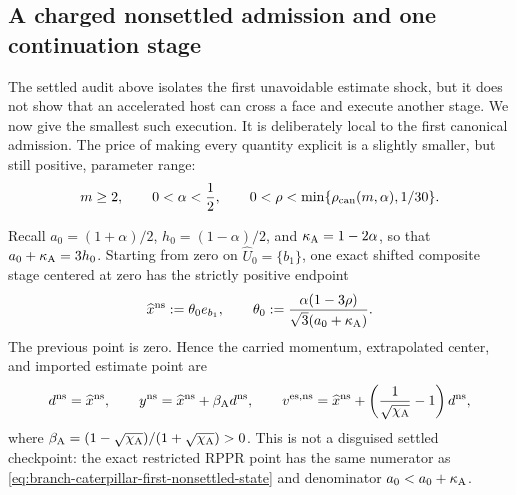 \subsection{A charged nonsettled admission and one continuation stage}
\label{sec:branch-caterpillar-nonsettled-continuation}

The settled audit above isolates the first unavoidable estimate shock, but it
does not show that an accelerated host can cross a face and execute another
stage.  We now give the smallest such execution.  It is deliberately local to
the first canonical admission.  The price of making every quantity explicit
is a slightly smaller, but still positive, parameter range:
\begin{equation}
 m\geq2,
 \qquad 0<\alpha<\frac12,
 \qquad
 0<\rho<\min\{\rho_{\rm can}(m,\alpha),1/30\}.
 \label{eq:branch-caterpillar-nonsettled-range}
\end{equation}

Recall $a_0=(1+\alpha)/2$, $h_0=(1-\alpha)/2$, and
$\kappa_{\rm A}=1-2\alpha$, so that
$a_0+\kappa_{\rm A}=3h_0$.  Starting from zero on
$\widehat U_0=\{b_1\}$, one exact shifted composite stage centered at zero
has the strictly positive endpoint
\begin{equation}
 \widehat x^{\rm ns}
 :=\theta_0 e_{b_1},
 \qquad
 \theta_0:=
 \frac{\alpha(1-3\rho)}{\sqrt3(a_0+\kappa_{\rm A})}.
 \label{eq:branch-caterpillar-first-nonsettled-state}
\end{equation}
The previous point is zero.  Hence the carried momentum, extrapolated center,
and imported estimate point are
\begin{equation}
 d^{\rm ns}=\widehat x^{\rm ns},
 \qquad
 y^{\rm ns}=\widehat x^{\rm ns}+\beta_{\rm A}d^{\rm ns},
 \qquad
 v^{{\rm es},{\rm ns}}
 =\widehat x^{\rm ns}
  +\left(\frac1{\sqrt{\chi_{\rm A}}}-1\right)d^{\rm ns},
 \label{eq:branch-caterpillar-first-nonsettled-auxiliary-state}
\end{equation}
where
$\beta_{\rm A}=(1-\sqrt{\chi_{\rm A}})/(1+\sqrt{\chi_{\rm A}})>0$.
This is not a disguised settled checkpoint: the exact restricted RPPR point
has the same numerator as \cref{eq:branch-caterpillar-first-nonsettled-state}
and denominator $a_0<a_0+\kappa_{\rm A}$.

